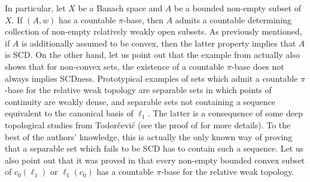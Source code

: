 \documentclass[11pt,a4paper,reqno]{amsart}
\numberwithin{equation}{section}
\newcommand{\1}{\mathbbm{1}}
\theoremstyle{plain}
\theoremstyle{definition}
\begin{document}
In particular, let $X$ be a Banach space and $A$ be a bounded non-empty subset of $X$. If $(A,w)$ has a countable $\pi$-base, then $A$ admits a countable determining collection of non-empty relatively weakly open subsets.  As previously mentioned, if $A$ is additionally assumed to be convex, then the latter property implies that $A$ is SCD. On the other hand, let us point out that the example from \cite[Proposition~10.7.6]{KMRZW25} actually also shows that for non-convex sets, the existence of a countable $\pi$-base does not always implies SCDness. Prototypical examples of sets which admit a countable $\pi$-base for the relative weak topology are separable sets in which points of continuity are weakly dense, and separable sets not containing a sequence equivalent to the canonical basis of $\ell_1$. The latter is a consequence of some deep topological studies from Todorčević (see the proof of \cite[Theorem~2.22]{AKMMS10} for more details). To the best of the authors' knowledge, this is actually the only known way of proving that a separable set which fails to be SCD has to contain such a sequence. Let us also point out that it was proved in \cite[Section~6.2]{AKMMS10} that every non-empty bounded convex subset of $c_0(\ell_1)$ or $\ell_1(c_0)$ has a countable $\pi$-base for the relative weak topology. 
\end{document}
